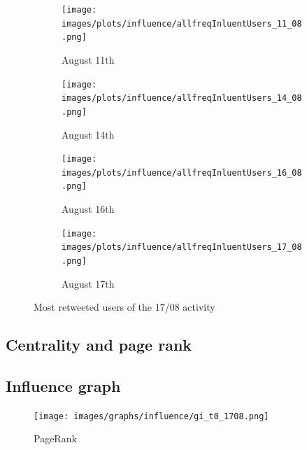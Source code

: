 \documentclass[a4paper,12pt]{report}
\begin{document}
\begin{figure}[H]
\begin{subfigure}[t]{0.5\textwidth}
\begin{center}
	\texttt{[image: images/plots/influence/allfreqInluentUsers\_11\_08.png]}
	\caption{August 11th}
\end{center}
\end{subfigure}
\hfill
\begin{subfigure}[t]{0.5\textwidth}
\begin{center}
	\texttt{[image: images/plots/influence/allfreqInluentUsers\_14\_08.png]}
	\caption{August 14th}
\end{center}
\end{subfigure}

\begin{subfigure}[t]{0.5\textwidth}
\begin{center}
	\texttt{[image: images/plots/influence/allfreqInluentUsers\_16\_08.png]}
	\caption{August 16th}
\end{center}
\end{subfigure}
\hfill
\begin{subfigure}[t]{0.5\textwidth}
\begin{center}
	\texttt{[image: images/plots/influence/allfreqInluentUsers\_17\_08.png]}
	\caption{August 17th}
\end{center}
\end{subfigure}
\label{activitiesPlots}
\caption{Most retweeted users of the 17/08 activity}
\end{figure}


\subsection{Centrality and page rank}

\newpage

\subsection{Influence graph}
\begin{figure}[H]
\centering
\texttt{[image: images/graphs/influence/gi\_t0\_1708.png]}
\caption{PageRank}
\end{figure}
\end{document}
